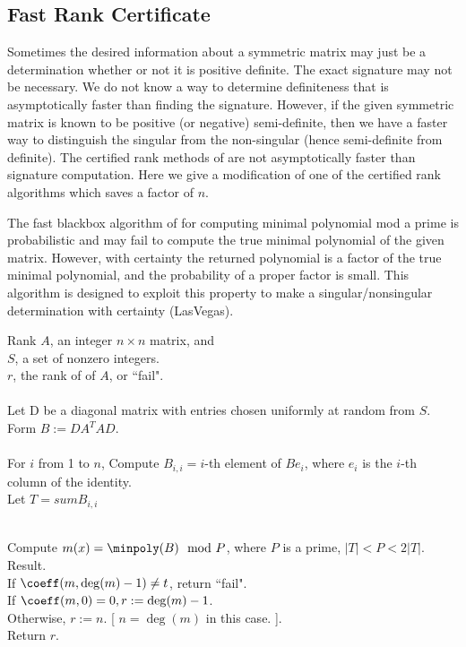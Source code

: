 \subsection{Fast Rank Certificate}
Sometimes the desired information about a symmetric matrix may just be a determination whether or
not it is positive definite.  The exact signature may not be necessary.  We do not know a way
to determine definiteness that is asymptotically faster than finding the signature.  However,
if the given symmetric matrix is known to be positive (or negative) semi-definite, then we have 
a faster way to distinguish the singular from the non-singular (hence semi-definite from definite).
The certified rank methods of \cite{ssv03} are not asymptotically faster than signature
computation.  Here we give a modification of one of the certified rank algorithms which saves
a factor of $n$.

The fast blackbox algorithm of \cite{Wied86} for computing minimal polynomial mod a prime 
is probabilistic and may fail to compute the true minimal polynomial of the given matrix.
However, with certainty the returned polynomial is a factor of the true minimal polynomial,
and the probability of a proper factor is small.
This algorithm is designed to exploit this property to make a singular/nonsingular determination
with certainty (LasVegas).

\begin{algorithm}{Rank}
\Inspec $A$, an integer $n\times n$ matrix, and\\
\> $S$, a set of nonzero integers.\\
\Outspec $r$, the rank of of $A$, or ``fail".\\

\Stmt[1.] [ Precondition. ]\\
Let D be a diagonal matrix with entries chosen uniformly at random from $S$.\\
Form $B := DA^T AD$.\\
 \\
For $i$ from 1 to $n$, Compute $B_{i,i} = i$-th element of $Be_i$, where $e_i$ is the $i$-th column of the identity.\\
Let $T = sum B_{i,i}$

\Stmt[3.] [ Minpoly. ]\\
Compute $m(x) = \minpoly(B) \mod P$, where $P$ is a prime, $|T| < P < 2|T|$.
\Stmt[4.] \lb Result. \rb\\
If $\coeff(m, \deg(m) - 1) \neq t$, return ``fail".\\
If $\coeff(m, 0) = 0, r := \deg(m) - 1$.\\
Otherwise, $r := n$. [ $n = \deg(m)$ in this case. ].\\
Return $r$.
\end{algorithm}

